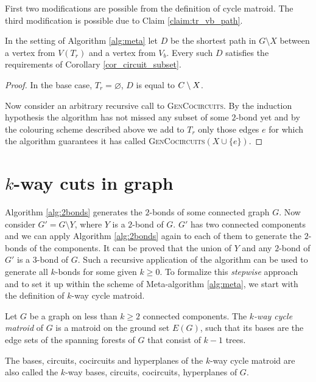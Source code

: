 First two modifications are possible from the definition of cycle matroid. The third modification is possible due to Claim \ref{claim:tr_vb_path}.

\begin{claim}
	\label{claim:tr_vb_path}
	In the setting of Algorithm \ref{alg:meta} let $D$ be the shortest path in $G \setminus X$ between a vertex from $V(T_r)$ and a vertex from $V_b$. Every such $D$ satisfies the requirements of Corollary \ref{cor_circuit_subset}.
\end{claim}


\begin{proof}
	In the base case, $T_r = \varnothing$, $D$ is equal to $C \setminus X$.

Now consider an arbitrary recursive call to \textsc{GenCocircuits}. By the induction hypothesis the algorithm has not missed any subset of some $2$-bond yet and by the colouring scheme described above we add to $T_r$ only those edges $e$ for which the algorithm guarantees it has called \textsc{GenCocircuits}$(X \cup \{e\})$.
\end{proof}

\section{$k$-way cuts in graph}

Algorithm \ref{alg:2bonds} generates the $2$-bonds of some connected graph $G$. Now consider $G' = G \setminus Y$, where $Y$ is a $2$-bond of $G$. $G'$ has two connected components and we can apply Algorithm \ref{alg:2bonds} again to each of them to generate the $2$-bonds of the components. It can be proved that the union of $Y$ and any $2$-bond of $G'$ is a $3$-bond of $G$. Such a recursive application of the algorithm can be used to generate all $k$-bonds for some given $k \geq 0$. To formalize this \textit{stepwise} approach and to set it up within the scheme of Meta-algorithm \ref{alg:meta}, we start with the definition of $k$-way cycle matroid.

\begin{defn}
	\label{defn:kway_cycle_matroid}
	Let $G$ be a graph on less than $k \geq 2$ connected components. The \textit{$k$-way cycle matroid} of $G$ is a matroid on the ground set $E(G)$, such that its bases are the edge sets of the spanning forests of $G$ that consist of $k-1$ trees.

	The bases, circuits, cocircuits and hyperplanes of the $k$-way cycle matroid are also called the $k$-way bases, circuits, cocircuits, hyperplanes of $G$.
\end{defn}


